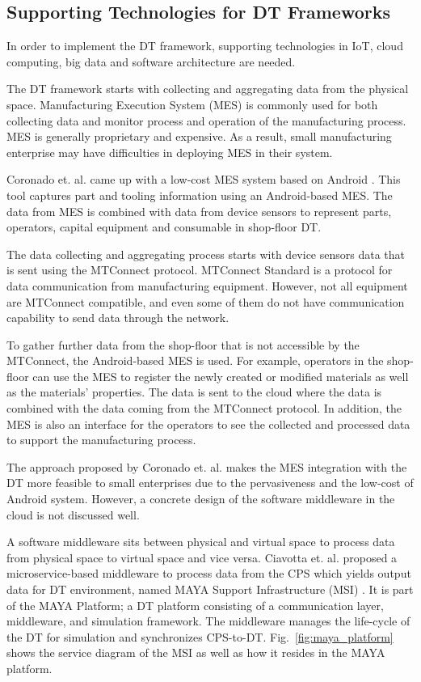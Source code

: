 \documentclass[article]{aaltoseries}
\begin{document}
\subsection{Supporting Technologies for DT Frameworks}
In order to implement the DT framework, supporting technologies in IoT, cloud computing, big data and software architecture are needed.

The DT framework starts with collecting and aggregating data from the physical space. Manufacturing Execution System (MES) is commonly used for both collecting data and monitor process and operation of the manufacturing process. MES is generally proprietary and expensive. As a result, small manufacturing enterprise may have difficulties in deploying MES in their system.

Coronado et. al. came up with a low-cost MES system based on Android \cite{UrbinaCoronado2018}. This tool captures part and tooling information using an Android-based MES. The data from MES is combined with data from device sensors to represent parts, operators, capital equipment and consumable in shop-floor DT.

The data collecting and aggregating process starts with device sensors data that is sent using the MTConnect protocol. MTConnect Standard is a protocol for data communication from manufacturing equipment. However, not all equipment are MTConnect compatible, and even some of them do not have communication capability to send data through the network.

To gather further data from the shop-floor that is not accessible by the MTConnect, the Android-based MES is used. For example, operators in the shop-floor can use the MES to register the newly created or modified materials as well as the materials' properties. The data is sent to the cloud where the data is combined with the data coming from the MTConnect protocol. In addition, the MES is also an interface for the operators to see the collected and processed data to support the manufacturing process.

The approach proposed by Coronado et. al. makes the MES integration with the DT more feasible to small enterprises due to the pervasiveness and the low-cost of Android system. However, a concrete design of the software middleware in the cloud is not discussed well.   

A software middleware sits between physical and virtual space to process data from physical space to virtual space and vice versa. Ciavotta et. al. proposed a microservice-based middleware to process data from the CPS which yields output data for DT environment, named MAYA Support Infrastructure (MSI) \cite{ciavotta2017microservice}. It is part of the MAYA Platform; a DT platform consisting of a communication layer, middleware, and simulation framework. The middleware manages the life-cycle of the DT for simulation and synchronizes CPS-to-DT. Fig.~\ref{fig:maya_platform} shows the service diagram of the MSI as well as how it resides in the MAYA platform.
\end{document}
